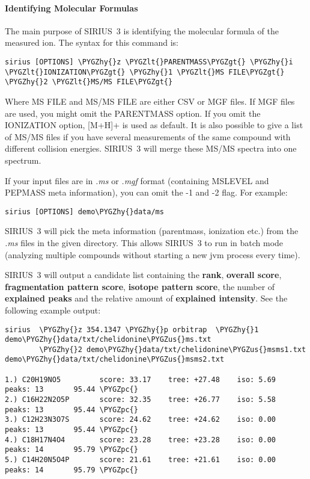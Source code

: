 \documentclass[letterpaper,10pt,openany,oneside]{sphinxmanual}
\def\PYGZus{\char`\_}
\def\PYGZlt{\char`\<}
\def\PYGZgt{\char`\>}
\def\PYGZpc{\char`\%}
\def\PYGZhy{\char`\-}
\begin{document}
\paragraph{Identifying Molecular Formulas}
\label{commandline:identifying-molecular-formulas}
The main purpose of SIRIUS~3 is identifying the molecular formula of the measured ion. The syntax for this command is:

\begin{Verbatim}[commandchars=\\\{\}]
sirius [OPTIONS] \PYGZhy{}z \PYGZlt{}PARENTMASS\PYGZgt{} \PYGZhy{}i \PYGZlt{}IONIZATION\PYGZgt{} \PYGZhy{}1 \PYGZlt{}MS FILE\PYGZgt{} \PYGZhy{}2 \PYGZlt{}MS/MS FILE\PYGZgt{}
\end{Verbatim}

Where MS FILE and MS/MS FILE are either CSV or MGF files. If MGF files are used, you might omit the PARENTMASS option. If you omit the IONIZATION option, {[}M+H{]}+ is used as default. It is also possible to give a list of MS/MS files if you have several measurements of the same compound with different collision energies. SIRIUS~3 will merge these MS/MS spectra into one spectrum.

If your input files are in \emph{.ms} or \emph{.mgf} format (containing MSLEVEL and PEPMASS meta information), you can omit the -1 and -2 flag. For example:

\begin{Verbatim}[commandchars=\\\{\}]
sirius [OPTIONS] demo\PYGZhy{}data/ms
\end{Verbatim}

SIRIUS~3 will pick the meta information (parentmass, ionization etc.) from the \emph{.ms} files in the given directory. This allows SIRIUS~3 to run in batch mode (analyzing multiple compounds without starting a new jvm process every time).

SIRIUS~3 will output a candidate list containing the \textbf{rank}, \textbf{overall score}, \textbf{fragmentation pattern score}, \textbf{isotope pattern score}, the number of \textbf{explained peaks} and the relative amount of \textbf{explained intensity}. See the following example output:

\begin{Verbatim}[commandchars=\\\{\}]
sirius  \PYGZhy{}z 354.1347 \PYGZhy{}p orbitrap  \PYGZhy{}1 demo\PYGZhy{}data/txt/chelidonine\PYGZus{}ms.txt
        \PYGZhy{}2 demo\PYGZhy{}data/txt/chelidonine\PYGZus{}msms1.txt demo\PYGZhy{}data/txt/chelidonine\PYGZus{}msms2.txt

1.) C20H19NO5         score: 33.17    tree: +27.48    iso: 5.69       peaks: 13       95.44 \PYGZpc{}
2.) C16H22N2O5P       score: 32.35    tree: +26.77    iso: 5.58       peaks: 13       95.44 \PYGZpc{}
3.) C12H23N3O7S       score: 24.62    tree: +24.62    iso: 0.00       peaks: 13       95.44 \PYGZpc{}
4.) C18H17N4O4        score: 23.28    tree: +23.28    iso: 0.00       peaks: 14       95.79 \PYGZpc{}
5.) C14H20N5O4P       score: 21.61    tree: +21.61    iso: 0.00       peaks: 14       95.79 \PYGZpc{}
\end{Verbatim}
\end{document}
